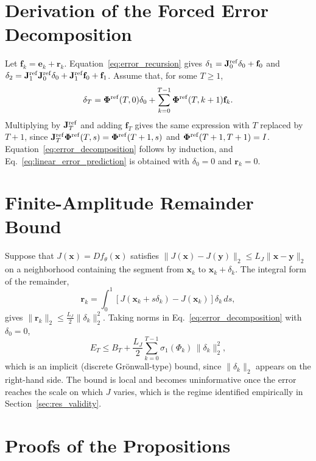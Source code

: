 \section{Derivation of the Forced Error Decomposition}
\label{app:derivation}

Let $\mathbf f_k=\mathbf e_k+\mathbf r_k$. Equation~\eqref{eq:error_recursion} gives $\delta_1=\mathbf J^{\rm ref}_0\delta_0+\mathbf f_0$ and $\delta_2=\mathbf J^{\rm ref}_1\mathbf J^{\rm ref}_0\delta_0+\mathbf J^{\rm ref}_1\mathbf f_0+\mathbf f_1$. Assume that, for some $T\ge1$,
\begin{equation*}
\delta_{T}=\boldsymbol{\Phi}^{\rm ref}(T,0)\delta_0+\sum_{k=0}^{T-1}\boldsymbol{\Phi}^{\rm ref}(T,k+1)\mathbf f_{k}.
\end{equation*}
Multiplying by $\mathbf J^{\rm ref}_T$ and adding $\mathbf f_T$ gives the same expression with $T$ replaced by $T+1$, since $\mathbf J^{\rm ref}_T\boldsymbol{\Phi}^{\rm ref}(T,s)=\boldsymbol{\Phi}^{\rm ref}(T+1,s)$ and $\boldsymbol{\Phi}^{\rm ref}(T+1,T+1)=I$. Equation~\eqref{eq:error_decomposition} follows by induction, and Eq.~\eqref{eq:linear_error_prediction} is obtained with $\delta_0=0$ and $\mathbf r_k=0$.

\section{Finite-Amplitude Remainder Bound}
\label{app:remainder}

Suppose that $J(\mathbf x)=Df_\theta(\mathbf x)$ satisfies $\|J(\mathbf x)-J(\mathbf y)\|_2\le L_J\|\mathbf x-\mathbf y\|_2$ on a neighborhood containing the segment from $\mathbf x_k$ to $\mathbf x_k+\delta_k$. The integral form of the remainder,
\begin{equation*}
  \mathbf r_k=\int_0^1\left[J(\mathbf x_k+s\delta_k)-J(\mathbf x_k)\right]\delta_k\,ds,
\end{equation*}
gives $\|\mathbf r_k\|_2\le\frac{L_J}{2}\|\delta_k\|_2^2$. Taking norms in Eq.~\eqref{eq:error_decomposition} with $\delta_0=0$,
\begin{equation*}
  E_T\le B_T+\frac{L_J}{2}\sum_{k=0}^{T-1}\sigma_1(\Phi_k)\,\|\delta_k\|_2^2,
\end{equation*}
which is an implicit (discrete Gr\"onwall-type) bound, since $\|\delta_k\|_2$ appears on the right-hand side. The bound is local and becomes uninformative once the error reaches the scale on which $J$ varies, which is the regime identified empirically in Section~\ref{sec:res_validity}.

\section{Proofs of the Propositions}
\label{app:proofs}

